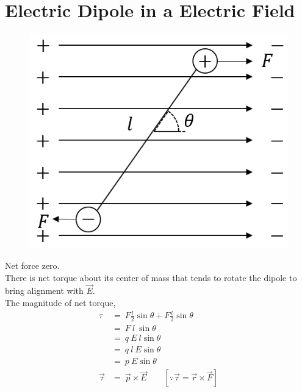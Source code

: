 \documentclass[12pt]{article}
\theoremstyle{definition}
\begin{document}
\section{Electric Dipole in a Electric Field}
\begin{figure}[H]
    \centering
    \includegraphics[scale=.75]{9.png}
\end{figure}
Net force zero.\\ There is net torque about its center of mass that tends to rotate the dipole to bring alignment with $ \vec{E} $.\\
The magnitude of net torque,
\begin{align*}
    \tau &=\ F\frac{l}{2}\sin \theta +F\frac{l}{2}\sin \theta \\
    &=\ F \ l\ \sin \theta \\
    &=\ q\ E\ l\sin \theta\\
    &=\ q\ l\ E\sin\theta\\
    &=\ p\ E\sin\theta\\
    \vec{\tau}&=\ \vec{p}\times\vec{E}  \qquad [\because  \vec{\tau}=\vec{r}\times\vec{F}]
\end{align*}
\end{document}

